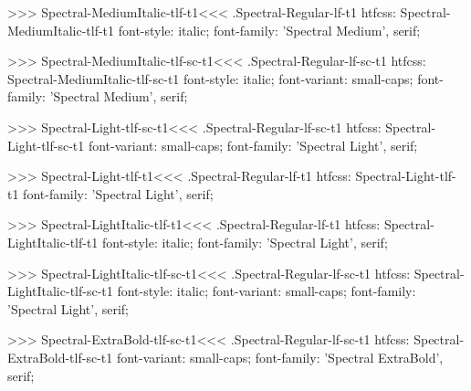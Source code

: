 >>>
\<Spectral-MediumItalic-tlf-t1\><<<
.Spectral-Regular-lf-t1
htfcss:  Spectral-MediumItalic-tlf-t1  font-style: italic; font-family: 'Spectral Medium', serif;

>>>
\<Spectral-MediumItalic-tlf-sc-t1\><<<
.Spectral-Regular-lf-sc-t1
htfcss:  Spectral-MediumItalic-tlf-sc-t1  font-style: italic; font-variant: small-caps; font-family: 'Spectral Medium', serif;

>>>
\<Spectral-Light-tlf-sc-t1\><<<
.Spectral-Regular-lf-sc-t1
htfcss:  Spectral-Light-tlf-sc-t1  font-variant: small-caps; font-family: 'Spectral Light', serif;

>>>
\<Spectral-Light-tlf-t1\><<<
.Spectral-Regular-lf-t1
htfcss:  Spectral-Light-tlf-t1  font-family: 'Spectral Light', serif;

>>>
\<Spectral-LightItalic-tlf-t1\><<<
.Spectral-Regular-lf-t1
htfcss:  Spectral-LightItalic-tlf-t1  font-style: italic; font-family: 'Spectral Light', serif;

>>>
\<Spectral-LightItalic-tlf-sc-t1\><<<
.Spectral-Regular-lf-sc-t1
htfcss:  Spectral-LightItalic-tlf-sc-t1  font-style: italic; font-variant: small-caps; font-family: 'Spectral Light', serif;

>>>
\<Spectral-ExtraBold-tlf-sc-t1\><<<
.Spectral-Regular-lf-sc-t1
htfcss:  Spectral-ExtraBold-tlf-sc-t1  font-variant: small-caps; font-family: 'Spectral ExtraBold', serif;

